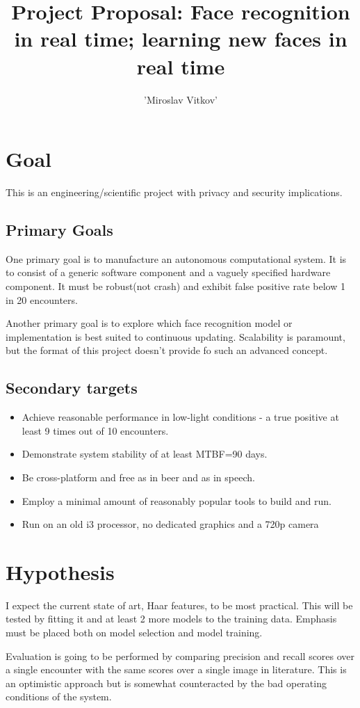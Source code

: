\documentclass{article}
\title{Project Proposal: Face recognition in real time; learning new faces in real time}
\author{'Miroslav Vitkov'}
\begin{document}
\maketitle

\section{Goal}
This is an engineering/scientific project with privacy and security implications.

\subsection{Primary Goals}
One primary goal is to manufacture an autonomous computational system.
It is to consist of a generic software component and a vaguely specified hardware component.
It must be robust(not crash) and exhibit false positive rate below 1 in 20 encounters.
\par
Another primary goal is to explore which face recognition model or implementation is best suited to continuous updating.
Scalability is paramount, but the format of this project doesn't provide fo such an advanced concept.

\subsection{Secondary targets}
\begin{itemize}
    \item{Achieve reasonable performance in low-light conditions - a true positive at least 9 times out of 10 encounters.}
    \item{Demonstrate system stability of at least MTBF=90 days.}
    \item{Be cross-platform and free as in beer and as in speech.}
    \item{Employ a minimal amount of reasonably popular tools to build and run.}
    \item{Run on an old i3 processor, no dedicated graphics and a 720p camera}
\end{itemize}

\section{Hypothesis}
I expect the current state of art, Haar features, to be most practical.
This will be tested by fitting it and at least 2 more models to the training data.
Emphasis must be placed both on model selection and model training.
\par
Evaluation is going to be performed by comparing precision and recall scores over a single encounter with the same scores over a single image in literature.
This is an optimistic approach but is somewhat counteracted by the bad operating conditions of the system.
\end{document}

